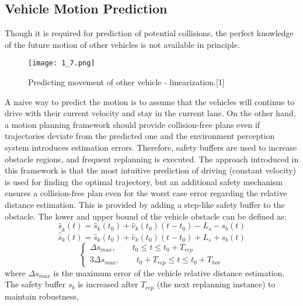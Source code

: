 \documentclass{thesisreport}
\begin{document}
\subsection{Vehicle Motion Prediction}
Though it is required for prediction of potential collisions, the perfect knowledge of the future motion of other vehicles is not available in principle. 
\begin{figure}[ht]
	\centering
	\texttt{[image: 1\_7.png]}
	\caption{Predicting movement of other vehicle - linearization.[1]}
	\label{fig:1.7} 
\end{figure}
A naive way to predict the motion is to assume that the vehicles will continue to drive with their current velocity and stay in the current lane. On the other hand, a motion planning framework should provide collision-free plans even if trajectories deviate from the predicted one and the environment perception system introduces estimation errors. Therefore, safety buffers are used to increase obstacle regions, and frequent replanning is executed. The approach introduced in this framework is that the most intuitive prediction of driving (constant velocity) is used for finding the optimal trajectory, but an additional safety mechanism ensures a collision-free plan even for the worst case error regarding the relative distance estimation. This is provided by adding a step-like safety buffer to the obstacle. The lower and upper bound of the vehicle obstacle can be defined as:
\begin{equation}
\hat{\underline{s}}_k(t) = \hat{s}_k(t_0) + \hat{v}_k(t_0)(t-t_0) - L_s -s_b(t)
\end{equation}
\begin{equation}
\hat{\overline{s}}_k(t) = \hat{s}_k(t_0) + \hat{v}_k(t_0)(t-t_0) + L_s + s_b(t)
\end{equation}
\begin{equation}
\begin{cases}
\Delta s_{max}, \qquad t_0 \leq t \leq t_0 + T_{rep}\\
3  \Delta s_{max}, \qquad t_0 + T_{rep} \leq t \leq t_0 + T_{hor}
\end{cases}
\end{equation}
where $\Delta s_{max}$ is the maximum error of the vehicle relative distance estimation. The safety buffer $s_b$ is increased after $T_{rep}$ (the next replanning instance) to maintain robustness,
\end{document}
